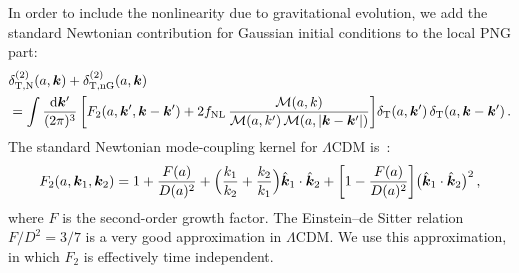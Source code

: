 {{{In order to include the nonlinearity due to gravitational evolution, we add the standard Newtonian  contribution for Gaussian initial conditions to the local PNG part:}  
\begin{align} \label{alpha3}
&\delta_{\mathrm{T,{N}}}^{(2)}(a,\bm {k}) + \delta_{\mathrm{T,nG}}^{(2)}(a,\bm {k})  
\\ \notag 
&{}= \int \frac{\mathrm{d} \bm {k}'}{(2\pi)^3}\, \bigg[{F_{2}}(a,\bm {k}',\bm {k}-\bm {k}') +  2f_\text{NL} \,\frac{{\cal M} (a,k)}{{\cal M} (a,k')\, {\cal M} (a,|\bm {k}-\bm {k}'|)} \bigg] \delta_{\mathrm{T}}(a,\bm {k}')\,\delta_{\mathrm{T}}(a,\bm {k}-\bm {k}') \,.
\end{align}
The standard Newtonian mode-coupling kernel
for $\Lambda$CDM is~\cite{Villa:2015ppa}:
\begin{equation}
F_{2}(a,\bm{k}_{1},\bm{k}_{2}) = 1 + \frac{F(a)}{D(a)^2} + \Big(\frac{k_1}{k_2}+ \frac{k_2}{k_1}\Big)\hat{\bm {k}}_1\cdot \hat{\bm {k}}_2 +\bigg[1 - \frac{F(a)}{D(a)^2}\bigg]\big( \hat{\bm {k}}_1\cdot \hat{\bm {k}}_2\big)^2\,,\label{f2k}
\end{equation}
where $F$ is the second-order growth factor.  The Einstein--de Sitter relation $F/D^2=3/7$ is a very good approximation in $\Lambda$CDM. We use this approximation, in which $F_2$ is effectively time independent.}

}
